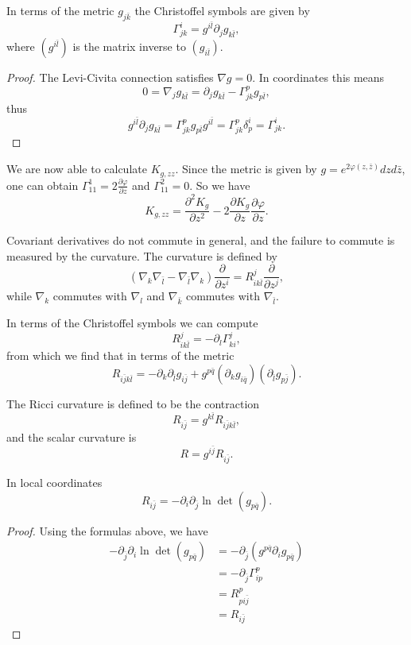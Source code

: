 \documentclass{ctexart}
\begin{document}
\begin{proposition}
  In terms of the metric $g_{j \bar{k}}$ the Christoffel symbols are given by
  $$
  \Gamma_{j k}^i=g^{i \bar{l}} \partial_j g_{k \bar{l}},
  $$
  where $(g^{i \bar{l}})$ is the matrix inverse to $(g_{i \bar{l}})$.
\end{proposition}
\begin{proof}[Proof]
  The Levi-Civita connection satisfies $\nabla g=0$. In coordinates this means
  $$
  0=\nabla_j g_{k \bar{l}}=\partial_j g_{k \bar{l}}-\Gamma_{j k}^p g_{p \bar{l}},
  $$
  thus
  $$
  g^{i \bar{l}} \partial_j g_{k \bar{l}}=\Gamma_{j k}^p g_{p \bar{l}} g^{i \bar{l}}=\Gamma_{j k}^p \delta_p^i=\Gamma_{j k}^i.
  $$
\end{proof}

We are now able to calculate  $K_{g, z z}$. Since the metric is given by $g=e^{2 \varphi(z, \bar{z})}d z d \bar{z}$, one can obtain 
$\Gamma_{1 1}^1= 2\frac{\partial \varphi}{\partial z}$ and $\Gamma_{1 1}^2=0$. So we have
$$
K_{g, z z}=\frac{\partial^2 K_g}{\partial z^2}-2 \frac{\partial K_g}{\partial z} \frac{\partial \varphi}{\partial z}.
$$

Covariant derivatives do not commute in general, and the failure to commute is measured by the curvature. The curvature is defined by
$$
\left(\nabla_k \nabla_{\bar{l}}-\nabla_{\bar{l}} \nabla_k\right) \frac{\partial}{\partial z^i}=R_{i k \bar{l}}^j \frac{\partial}{\partial z^j}, 
$$
while $\nabla_k$ commutes with $\nabla_l$ and $\nabla_{\bar{k}}$ commutes with $\nabla_{\bar{l}}$. 

In terms of the Christoffel symbols we can compute
$$
R_{i k \bar{l}}^j=-\partial_l \Gamma_{k i}^j,
$$
from which we find that in terms of the metric
$$
R_{i \bar{j} k \bar{l}}=-\partial_k \partial_{\bar{l}} g_{i \bar{j}}+g^{p \bar{q}}\left(\partial_k g_{i \bar{q}}\right)\left(\partial_{\bar{l}} g_{p \bar{j}}\right). 
$$

The Ricci curvature is defined to be the contraction
$$
R_{i \bar{j}}=g^{k \bar{l}} R_{i \bar{j} k \bar{l}},
$$
and the scalar curvature is
$$
R=g^{i \bar{j}} R_{i \bar{j}}.
$$
\begin{lemma}
  In local coordinates
  $$
  R_{i \bar{j}}=-\partial_i \partial_{\bar{j}} \ln \operatorname{det}\left(g_{p \bar{q}}\right) .
  $$
\end{lemma}
\begin{proof}[Proof]
  Using the formulas above, we have
  $$
  \begin{aligned}
  -\partial_{\bar{j}} \partial_i \ln \operatorname{det}\left(g_{p \bar{q}}\right) &=-\partial_{\bar{j}}\left(g^{p \bar{q}} \partial_i g_{p \bar{q}}\right) \\
  &=-\partial_{\bar{j}} \Gamma_{i p}^p \\
  &=R_{p i \bar{j}}^p \\
  &=R_{i \bar{j}}
  \end{aligned}
  $$
\end{proof}
\end{document}
